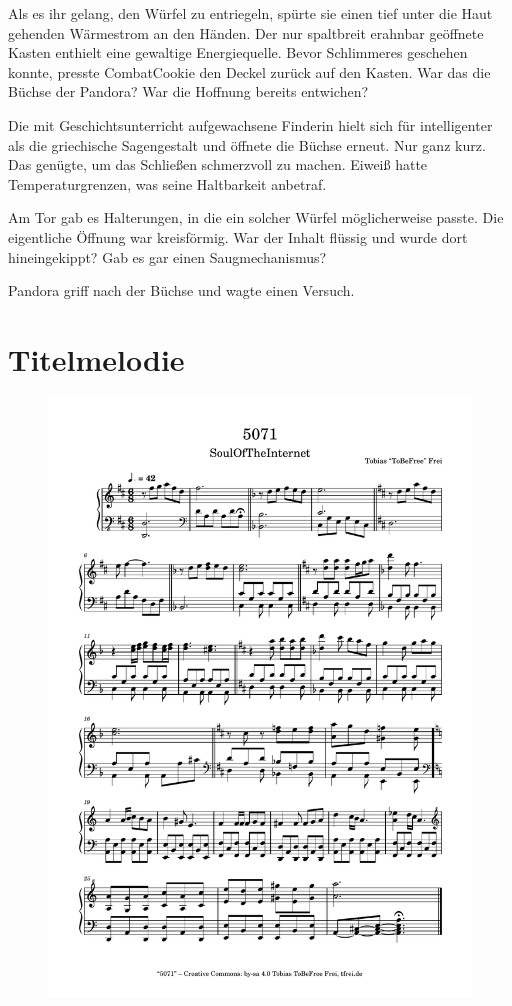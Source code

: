 Als es ihr gelang, den Würfel zu entriegeln, spürte sie einen tief unter die Haut gehenden Wärmestrom an den Händen. Der nur spaltbreit erahnbar geöffnete Kasten enthielt eine gewaltige Energiequelle. Bevor Schlimmeres geschehen konnte, presste CombatCookie den Deckel zurück auf den Kasten. War das die Büchse der Pandora? War die Hoffnung bereits entwichen?

Die mit Geschichtsunterricht aufgewachsene Finderin hielt sich für intelligenter als die griechische Sagengestalt und öffnete die Büchse erneut. Nur ganz kurz. Das genügte, um das Schließen schmerzvoll zu machen. Eiweiß hatte Temperaturgrenzen, was seine Haltbarkeit anbetraf.

Am Tor gab es Halterungen, in die ein solcher Würfel möglicherweise passte. Die eigentliche Öffnung war kreisförmig. War der Inhalt flüssig und wurde dort hineingekippt? Gab es gar einen Saugmechanismus?

Pandora griff nach der Büchse und wagte einen Versuch.


\chapter{Titelmelodie}

\begin{figure}[p]
    \includegraphics[width=\textwidth, page=1]{z-include-5071theme.pdf}
\end{figure}



